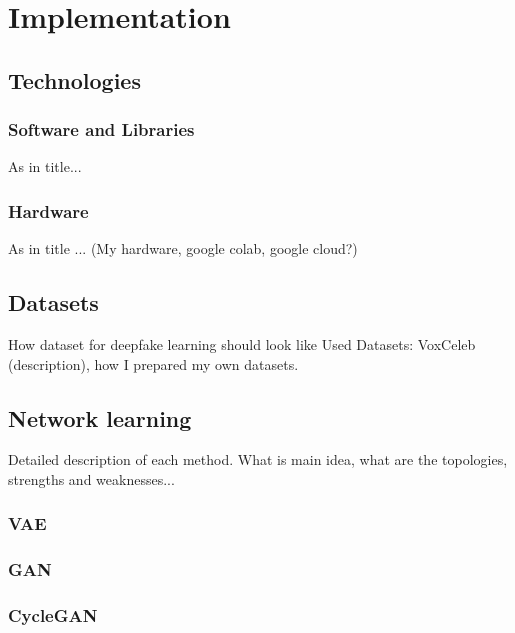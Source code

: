 \chapter{Implementation}
\section{Technologies}
\subsection{Software and Libraries}
As in title...

\subsection{Hardware}
As in title ... (My hardware, google colab, google cloud?)

\section{Datasets}
How dataset for deepfake learning should look like
Used Datasets: VoxCeleb (description), how I prepared my own datasets.

\section{Network learning}
Detailed description of each method. What is main idea, what are the topologies, strengths and weaknesses...
\subsection{VAE}
\subsection{GAN}
\subsection{CycleGAN}